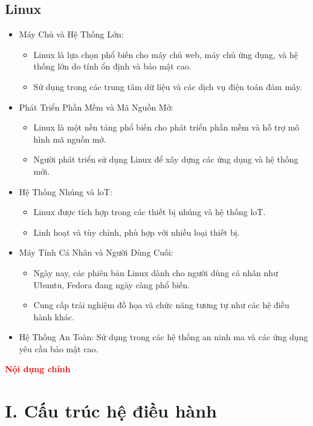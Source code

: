 \documentclass[12pt,a4paper]{article}
\begin{document}
\subsection{Linux}
\begin{itemize}
	\item Máy Chủ và Hệ Thống Lớn:
	\begin{itemize}
		\item Linux là lựa chọn phổ biến cho máy chủ web, máy chủ ứng dụng, và hệ thống lớn do tính ổn định và bảo mật cao.
		\item Sử dụng trong các trung tâm dữ liệu và các dịch vụ điện toán đám mây.
	\end{itemize} 
	\item Phát Triển Phần Mềm và Mã Nguồn Mở:
		\begin{itemize}
		\item Linux là một nền tảng phổ biến cho phát triển phần mềm và hỗ trợ mô hình mã nguồn mở.
		\item Người phát triển sử dụng Linux để xây dựng các ứng dụng và hệ thống mới.
		\end{itemize}
	\item Hệ Thống Nhúng và loT:
		\begin{itemize}
		\item Linux được tích hợp trong các thiết bị nhúng và hệ thống loT.
		\item Linh hoạt và tùy chỉnh, phù hợp với nhiều loại thiết bị.
		\end{itemize}
	\item Máy Tính Cá Nhân và Người Dùng Cuối:
		\begin{itemize}
		\item Ngày nay, các phiên bản Linux dành cho người dùng cá nhân như Ubuntu, Fedora đang ngày càng phổ biến.
		\item Cung cấp trải nghiệm đồ họa và chức năng tương tự như các hệ điều hành khác.
		\end{itemize}
	\item Hệ Thống An Toàn: Sử dụng trong các hệ thống an ninh ma và các ứng dụng yêu cầu bảo mật cao.
\end{itemize}
\newpage
{}
\begin{center}
	{\fontsize{30}{14}\selectfont \textbf{\textcolor{red}{Nội dụng chính}}}
\end{center}
\setcounter{section}{0}
\section{I.	Cấu trúc hệ điều hành}
\end{document}
